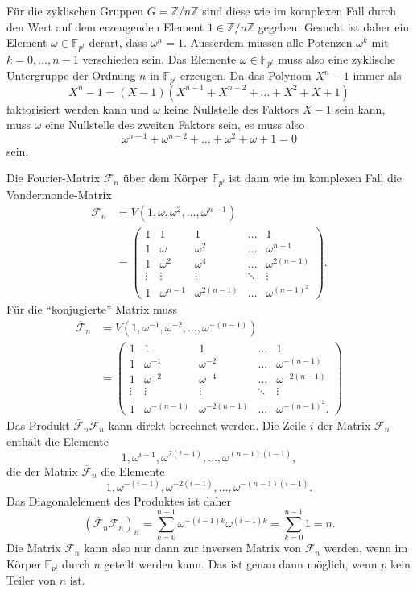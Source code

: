 Für die zyklischen Gruppen $G=\mathbb{Z}/n\mathbb{Z}$ sind diese wie
im komplexen Fall durch den Wert auf dem erzeugenden Element
$1\in\mathbb{Z}/n\mathbb{Z}$ gegeben.
Gesucht ist daher ein Element $\omega\in\mathbb{F}_{p^l}$ derart,
dass $\omega^n=1$.
Ausserdem müssen alle Potenzen $\omega^k$ mit $k=0,\dots,n-1$
verschieden sein.
Das Elemente $\omega\in\mathbb{F}_{p^l}$ muss also eine
zyklische Untergruppe der Ordnung $n$ in $\mathbb{F}_{p^l}$ 
erzeugen.
Da das Polynom $X^n-1$ immer als
\[
X^n-1
=
(X-1)(X^{n-1}+X^{n-2}+\dots+X^2+X+1)
\]
faktorisiert werden kann und $\omega$ keine Nullstelle des Faktors
$X-1$ sein kann, muss $\omega$ eine Nullstelle des zweiten Faktors sein,
es muss also
\begin{equation}
\omega^{n-1}+\omega^{n-2}+\dots+\omega^2 + \omega + 1 = 0
\label{buch:diskret:koerper:eqn:summeomega}
\end{equation}
sein.

Die Fourier-Matrix $\mathscr{F}_n$ über dem Körper $\mathbb{F}_{p^l}$
ist dann wie im komplexen Fall die Vandermonde-Matrix
\begin{align*}
\mathscr{F}_n
&=
V(1,\omega,\omega^2,\dots,\omega^{n-1})
\\
&=
\begin{pmatrix}
1&1&1&\dots&1\\
1&\omega&\omega^2&\dots&\omega^{n-1}\\
1&\omega^2&\omega^4&\dots&\omega^{2(n-1)}\\
\vdots&\vdots&\vdots&\ddots&\vdots\\
1&\omega^{n-1}&\omega^{2(n-1)}&\dots&\omega^{(n-1)^2}
\end{pmatrix}.
\end{align*}
Für die ``konjugierte'' Matrix muss
\begin{align*}
\overline{\mathscr{F}}_n
&=
V(1,\omega^{-1},\omega^{-2},\dots,\omega^{-(n-1)})
\\
&=
\begin{pmatrix}
1&1&1&\dots&1\\
1&\omega^{-1}&\omega^{-2}&\dots&\omega^{-(n-1)}\\
1&\omega^{-2}&\omega^{-4}&\dots&\omega^{-2(n-1)}\\
\vdots&\vdots&\vdots&\ddots&\vdots\\
1&\omega^{-(n-1)}&\omega^{-2(n-1)}&\dots&\omega^{-(n-1)^2}.
\end{pmatrix}
\end{align*}
Das Produkt $\overline{\mathscr{F}}_n\mathscr{F}_n$ kann direkt
berechnet werden.
Die Zeile $i$ der Matrix $\mathscr{F}_n$ enthält die Elemente 
\[
1,\omega^{i-1},\omega^{2(i-1)},\dots,\omega^{(n-1)(i-1)},
\]
die der Matrix $\overline{\mathscr{F}}_n$ die Elemente
\[
1,\omega^{-(i-1)},\omega^{-2(i-1)},\dots,\omega^{-(n-1)(i-1)}.
\]
Das Diagonalelement des Produktes ist daher
\[
(\overline{\mathscr{F}}_n
\mathscr{F}_n)_{ii}
=
\sum_{k=0}^{n-1}
\omega^{-(i-1)k}\omega^{(i-1)k}
=
\sum_{k=0}^{n-1} 1
=
n.
\]
Die Matrix $\overline{\mathscr{F}}_n$ kann also nur dann zur
inversen Matrix von $\mathscr{F}_n$ werden, wenn im Körper
$\mathbb{F}_{p^l}$ durch $n$ geteilt werden kann.
Das ist genau dann möglich, wenn $p$ kein Teiler von $n$ ist.

